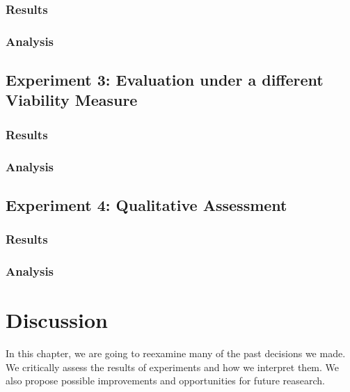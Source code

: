 \documentclass[12pt,a4paper]{report}
\begin{document}
\subsection{Results}


\subsection{Analysis}




\section{Experiment 3: Evaluation under a different Viability Measure}
\label{sec:experiment3}
\subsection{Results}

\subsection{Analysis}


\section{Experiment 4: Qualitative Assessment}
\label{sec:experiment4}
\subsection{Results}

\subsection{Analysis}



\chapter{Discussion}
\label{ch:dicussion}
In this chapter, we are going to reexamine many of the past decisions we made. We critically assess the results of experiments and how we interpret them. We also propose possible improvements and opportunities for future reasearch.
\end{document}
